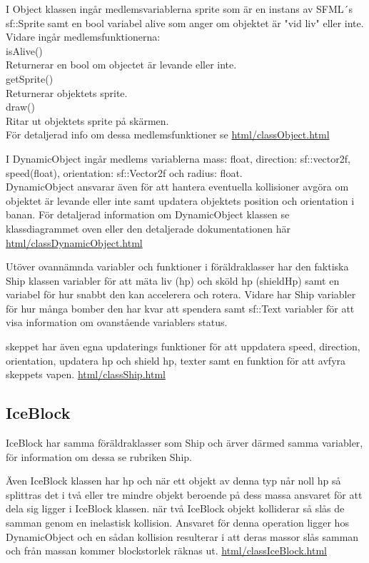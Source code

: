 \documentclass{TDP005mall}
\begin{document}
I Object klassen ingår medlemsvariablerna sprite som är en instans av SFML´s sf::Sprite
samt en bool variabel alive som anger om objektet är "vid liv" eller inte.
Vidare ingår medlemsfunktionerna:\\
isAlive()\\
Returnerar en bool om objectet är levande eller inte.\\
getSprite()\\
Returnerar objektets sprite.\\
draw()\\
Ritar ut objektets sprite på skärmen.\\
För detaljerad info om dessa medlemsfunktioner se
\url{html/classObject.html}

I DynamicObject ingår medlems variablerna mass: float, 
direction: sf::vector2f, speed(float), orientation: sf::Vector2f och 
radius: float.\\
DynamicObject ansvarar även för att hantera eventuella kollisioner avgöra om objektet är
levande eller inte samt updatera objektets position och orientation i banan.
För detaljerad information om DynamicObject klassen se klassdiagrammet oven eller den
detaljerade dokumentationen här \url{html/classDynamicObject.html}

Utöver ovannämnda variabler och funktioner i föräldraklasser har den faktiska 
Ship klassen variabler för att mäta liv (hp) och sköld hp (shieldHp) samt en variabel för hur
snabbt den kan accelerera och rotera. Vidare har Ship variabler för hur många bomber den har
kvar att spendera samt sf::Text variabler för att visa information om ovanstående variablers
status. 

skeppet har även egna updaterings funktioner för att uppdatera speed, direction, orientation,
updatera hp och shield hp, texter samt en funktion för att avfyra skeppets vapen.
\url{html/classShip.html}

\subsection{IceBlock}
IceBlock har samma föräldraklasser som Ship och ärver därmed samma variabler, 
för information om dessa se rubriken Ship.

Även IceBlock klassen har hp och när ett objekt av denna typ når noll hp så splittras det i två
eller tre mindre objekt beroende på dess massa ansvaret för att dela sig ligger i IceBlock
klassen. när två IceBlock objekt kolliderar så slås de samman genom en inelastisk kollision.
Ansvaret för denna operation ligger hos DynamicObject och en sådan kollision resulterar i att
deras massor slås samman och från massan kommer blockstorlek räknas ut.
\url{html/classIceBlock.html}
\end{document}
